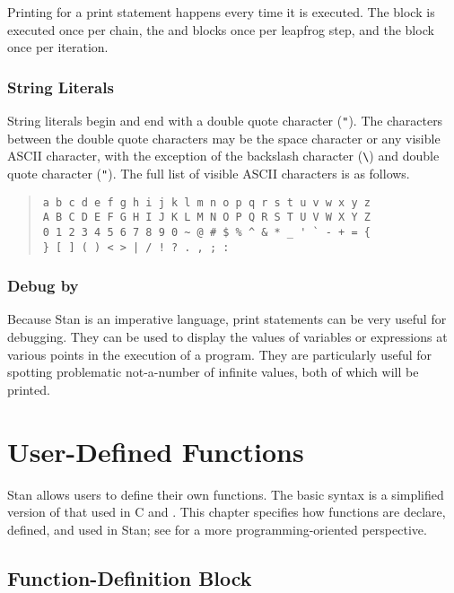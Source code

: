 Printing for a print statement happens every time it is executed.  The
 block is executed once per chain, the
 and  blocks once per leapfrog
step, and the  block once per iteration.

\subsection{String Literals}

String literals begin and end with a double quote character
(\Verb|"|).  The characters between the double quote characters may be
the space character or any visible ASCII character, with the exception
of the backslash character (\Verb|\|) and double quote character
(\Verb|"|).  The full list of visible ASCII characters is as follows.
%
\begin{quote}
\begin{Verbatim}
a b c d e f g h i j k l m n o p q r s t u v w x y z
A B C D E F G H I J K L M N O P Q R S T U V W X Y Z
0 1 2 3 4 5 6 7 8 9 0 ~ @ # $ % ^ & * _ ' ` - + = { 
} [ ] ( ) < > | / ! ? . , ; :
\end{Verbatim}
\end{quote}

\subsection{Debug by }

Because Stan is an imperative language, print statements can be very
useful for debugging.  They can be used to display the values of
variables or expressions at various points in the execution of a
program.  They are particularly useful for spotting problematic
not-a-number of infinite values, both of which will be printed.



\chapter{User-Defined Functions}\label{functions.chapter}%
%
\noindent
Stan allows users to define their own functions.  The basic syntax is
a simplified version of that used in C and \Cpp.  This chapter
specifies how functions are declare, defined, and used in Stan; see
 for a more programming-oriented
perspective.

\section{Function-Definition Block}

